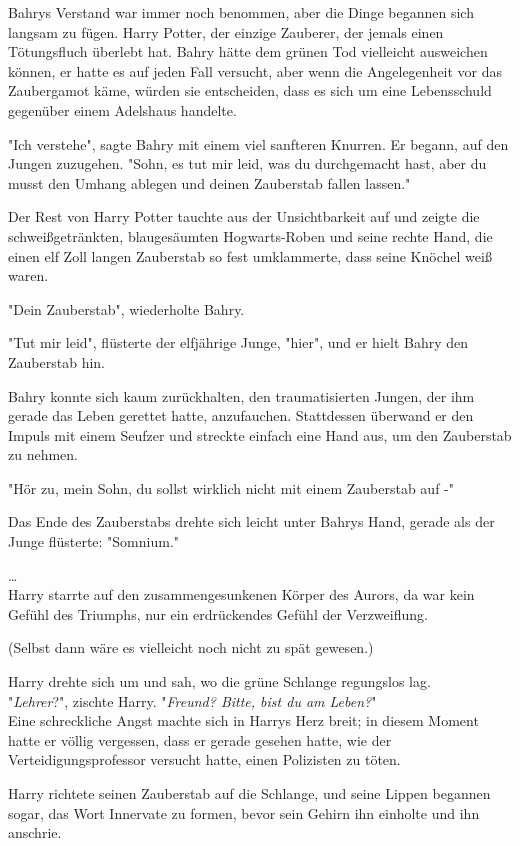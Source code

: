 {Bahrys Verstand war immer noch benommen, aber die Dinge begannen sich langsam zu fügen. Harry Potter, der einzige Zauberer, der jemals einen Tötungsfluch überlebt hat. Bahry hätte dem grünen Tod vielleicht ausweichen können, er hatte es auf jeden Fall versucht, aber wenn die Angelegenheit vor das Zaubergamot käme, würden sie entscheiden, dass es sich um eine Lebensschuld gegenüber einem Adelshaus handelte.

"Ich verstehe", sagte Bahry mit einem viel sanfteren Knurren. Er begann, auf den Jungen zuzugehen. "Sohn, es tut mir leid, was du durchgemacht hast, aber du musst den Umhang ablegen und deinen Zauberstab fallen lassen."

Der Rest von Harry Potter tauchte aus der Unsichtbarkeit auf und zeigte die schweißgetränkten, blaugesäumten Hogwarts-Roben und seine rechte Hand, die einen elf Zoll langen Zauberstab so fest umklammerte, dass seine Knöchel weiß waren.

"Dein Zauberstab", wiederholte Bahry.

"Tut mir leid", flüsterte der elfjährige Junge, "hier", und er hielt Bahry den Zauberstab hin.

Bahry konnte sich kaum zurückhalten, den traumatisierten Jungen, der ihm gerade das Leben gerettet hatte, anzufauchen. Stattdessen überwand er den Impuls mit einem Seufzer und streckte einfach eine Hand aus, um den Zauberstab zu nehmen.

"Hör zu, mein Sohn, du sollst wirklich nicht mit einem Zauberstab auf -"

Das Ende des Zauberstabs drehte sich leicht unter Bahrys Hand, gerade als der Junge flüsterte: "Somnium."

…\\ Harry starrte auf den zusammengesunkenen Körper des Aurors, da war kein Gefühl des Triumphs, nur ein erdrückendes Gefühl der Verzweiflung.

(Selbst dann wäre es vielleicht noch nicht zu spät gewesen.)

Harry drehte sich um und sah, wo die grüne Schlange regungslos lag.\\ "\emph{Lehrer}?", zischte Harry. "\emph{Freund? Bitte, bist du am Leben?}"\\ Eine schreckliche Angst machte sich in Harrys Herz breit; in diesem Moment hatte er völlig vergessen, dass er gerade gesehen hatte, wie der Verteidigungsprofessor versucht hatte, einen Polizisten zu töten.

Harry richtete seinen Zauberstab auf die Schlange, und seine Lippen begannen sogar, das Wort Innervate zu formen, bevor sein Gehirn ihn einholte und ihn anschrie.

}
